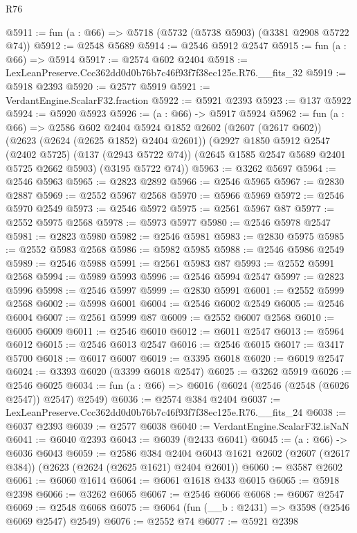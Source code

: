 \begin{lexlean}{R76}
\begin{coremodule}
@5911 := fun (a : @66) => @5718 (@5732 (@5738 @5903) (@3381 @2908 @5722 @74))
@5912 := @2548 @5689
@5914 := @2546 @5912 @2547
@5915 := fun (a : @66) => @5914
@5917 := @2574 @602 @2404
@5918 := LexLeanPreserve.Ccc362dd0d0b76b7c46f93f7f38ec125e.R76.__fits_32
@5919 := @5918 @2393
@5920 := @2577 @5919
@5921 := VerdantEngine.ScalarF32.fraction
@5922 := @5921 @2393
@5923 := @137 @5922
@5924 := @5920 @5923
@5926 := (a : @66) -> @5917 @5924
@5962 := fun (a : @66) =>
  @2586
    @602
    @2404
    @5924
    @1852
    @2602
    (@2607 (@2617 @602))
    (@2623 (@2624 (@2625 @1852) @2404 @2601))
    (@2927
      @1850
      @5912
      @2547
      (@2402 @5725)
      (@137 (@2943 @5722 @74))
      (@2645 @1585 @2547 @5689 @2401 @5725 @2662 @5903)
      (@3195 @5722 @74))
@5963 := @3262 @5697
@5964 := @2546 @5963
@5965 := @2823 @2892
@5966 := @2546 @5965
@5967 := @2830 @2887
@5969 := @2552 @5967 @2568
@5970 := @5966 @5969
@5972 := @2546 @5970 @2549
@5973 := @2546 @5972
@5975 := @2561 @5967 @87
@5977 := @2552 @5975 @2568
@5978 := @5973 @5977
@5980 := @2546 @5978 @2547
@5981 := @2823 @5980
@5982 := @2546 @5981
@5983 := @2830 @5975
@5985 := @2552 @5983 @2568
@5986 := @5982 @5985
@5988 := @2546 @5986 @2549
@5989 := @2546 @5988
@5991 := @2561 @5983 @87
@5993 := @2552 @5991 @2568
@5994 := @5989 @5993
@5996 := @2546 @5994 @2547
@5997 := @2823 @5996
@5998 := @2546 @5997
@5999 := @2830 @5991
@6001 := @2552 @5999 @2568
@6002 := @5998 @6001
@6004 := @2546 @6002 @2549
@6005 := @2546 @6004
@6007 := @2561 @5999 @87
@6009 := @2552 @6007 @2568
@6010 := @6005 @6009
@6011 := @2546 @6010
@6012 := @6011 @2547
@6013 := @5964 @6012
@6015 := @2546 @6013 @2547
@6016 := @2546 @6015
@6017 := @3417 @5700
@6018 := @6017 @6007
@6019 := @3395 @6018
@6020 := @6019 @2547
@6024 := @3393 @6020 (@3399 @6018 @2547)
@6025 := @3262 @5919
@6026 := @2546 @6025
@6034 := fun (a : @66) => @6016 (@6024 (@2546 (@2548 (@6026 @2547)) @2547) @2549)
@6036 := @2574 @384 @2404
@6037 := LexLeanPreserve.Ccc362dd0d0b76b7c46f93f7f38ec125e.R76.__fits_24
@6038 := @6037 @2393
@6039 := @2577 @6038
@6040 := VerdantEngine.ScalarF32.isNaN
@6041 := @6040 @2393
@6043 := @6039 (@2433 @6041)
@6045 := (a : @66) -> @6036 @6043
@6059 := @2586
    @384
    @2404
    @6043
    @1621
    @2602
    (@2607 (@2617 @384))
    (@2623 (@2624 (@2625 @1621) @2404 @2601))
@6060 := @3587 @2602
@6061 := @6060 @1614
@6064 := @6061 @1618 @433 @6015
@6065 := @5918 @2398
@6066 := @3262 @6065
@6067 := @2546 @6066
@6068 := @6067 @2547
@6069 := @2548 @6068
@6075 := @6064 (fun (__b : @2431) => @3598 (@2546 @6069 @2547) @2549)
@6076 := @2552 @74
@6077 := @5921 @2398

\end{coremodule}
\end{lexlean}
